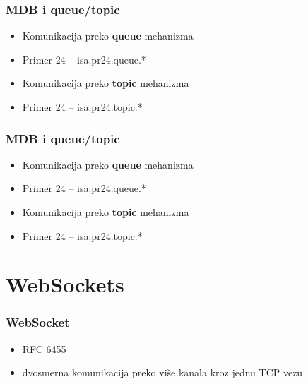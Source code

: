 \documentclass[compress]{beamer}
\begin{document}
\begin{frame}
  \frametitle{MDB i queue/topic}
  \begin{itemize}
    \item Komunikacija preko \textbf{queue} mehanizma
    \item Primer 24 -- isa.pr24.queue.*
  \end{itemize}
  
  \begin{itemize}
    \item Komunikacija preko \textbf{topic} mehanizma
    \item Primer 24 -- isa.pr24.topic.*
  \end{itemize}
\end{frame}

\begin{frame}
  \frametitle{MDB i queue/topic}
  \begin{itemize}
    \item Komunikacija preko \textbf{queue} mehanizma
    \item Primer 24 -- isa.pr24.queue.*
  \end{itemize}
  
  \begin{itemize}
    \item Komunikacija preko \textbf{topic} mehanizma
    \item Primer 24 -- isa.pr24.topic.*
  \end{itemize}
\end{frame}

\section[WS]{WebSockets}

\begin{frame}
  \frametitle{WebSocket}
  \begin{itemize}
    \item RFC 6455
    \item dvosmerna komunikacija preko više kanala kroz jednu TCP vezu
  \end{itemize}  
\end{frame}
\end{document}

